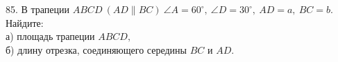 85. В трапеции $ABCD\ (AD\parallel BC)\ \angle A=60^\circ,\ \angle D=30^\circ,\ AD=a,\ BC=b.$ Найдите:\\
а) площадь трапеции $ABCD,$\\
б) длину отрезка, соединяющего середины $BC$ и $AD.$\\
